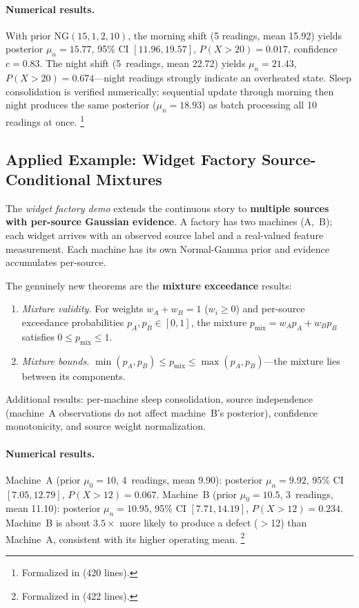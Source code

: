 \documentclass[11pt,openany]{report}
\begin{document}
\paragraph{Numerical results.}
With prior $\mathrm{NG}(15, 1, 2, 10)$, the morning shift
(5 readings, mean 15.92) yields posterior $\mu_n = 15.77$,
95\% CI $[11.96, 19.57]$, $P(X > 20) = 0.017$, confidence $c = 0.83$.
The night shift (5~readings, mean 22.72) yields $\mu_n = 21.43$,
$P(X > 20) = 0.674$---night readings strongly indicate an overheated
state.  Sleep consolidation is verified numerically: sequential update
through morning then night produces the same posterior
($\mu_n = 18.93$) as batch processing all 10 readings at once.%
\footnote{Formalized in  (420 lines).}

\subsection{Applied Example: Widget Factory Source-Conditional Mixtures}

The \emph{widget factory demo} extends the continuous story to
\textbf{multiple sources with per-source Gaussian evidence}.
A factory has two machines (A,~B); each widget arrives with an observed
source label and a real-valued feature measurement.  Each machine has
its own Normal-Gamma prior and evidence accumulates per-source.

The genuinely new theorems are the \textbf{mixture exceedance} results:
\begin{enumerate}
\item \emph{Mixture validity.}  For weights $w_A + w_B = 1$
  ($w_i \ge 0$) and per-source exceedance probabilities
  $p_A, p_B \in [0,1]$, the mixture
  $p_{\mathrm{mix}} = w_A p_A + w_B p_B$ satisfies
  $0 \le p_{\mathrm{mix}} \le 1$.

\item \emph{Mixture bounds.}  $\min(p_A, p_B) \le p_{\mathrm{mix}}
  \le \max(p_A, p_B)$---the mixture lies between its components.
\end{enumerate}
Additional results: per-machine sleep consolidation, source
independence (machine~A observations do not affect machine~B's
posterior), confidence monotonicity, and source weight normalization.

\paragraph{Numerical results.}
Machine~A (prior $\mu_0 = 10$, 4~readings, mean 9.90): posterior
$\mu_n = 9.92$, 95\% CI $[7.05, 12.79]$, $P(X > 12) = 0.067$.
Machine~B (prior $\mu_0 = 10.5$, 3~readings, mean 11.10): posterior
$\mu_n = 10.95$, 95\% CI $[7.71, 14.19]$, $P(X > 12) = 0.234$.
Machine~B is about $3.5\times$ more likely to produce a defect
($>$12) than Machine~A, consistent with its higher operating mean.%
\footnote{Formalized in  (422 lines).}
\end{document}

